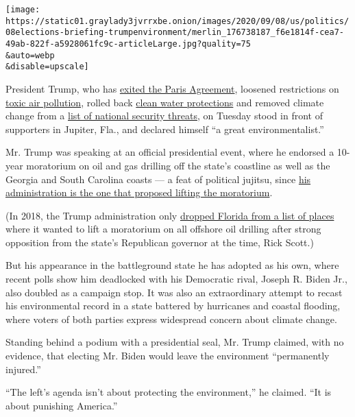 \texttt{[image: https://static01.graylady3jvrrxbe.onion/images/2020/09/08/us/politics/08elections-briefing-trumpenvironment/merlin\_176738187\_f6e1814f-cea7-49ab-822f-a5928061fc9c-articleLarge.jpg?quality=75\\\&auto=webp\\\&disable=upscale]}

President Trump, who has
\href{https://www.nytimes3xbfgragh.onion/2019/11/04/climate/trump-paris-agreement-climate.html}{exited
the Paris Agreement}, loosened restrictions on
\href{https://www.nytimes3xbfgragh.onion/2020/06/04/climate/trump-environment-coronavirus.html}{toxic
air pollution}, rolled back
\href{https://www.nytimes3xbfgragh.onion/2020/01/22/climate/trump-environment-water.html}{clean
water protections} and removed climate change from a
\href{https://www.nytimes3xbfgragh.onion/2019/07/30/opinion/trump-climate-change.html}{list
of national security threats}, on Tuesday stood in front of supporters
in Jupiter, Fla., and declared himself ``a great environmentalist.''

Mr. Trump was speaking at an official presidential event, where he
endorsed a 10-year moratorium on oil and gas drilling off the state's
coastline as well as the Georgia and South Carolina coasts --- a feat of
political jujitsu, since
\href{https://www.nytimes3xbfgragh.onion/2018/01/04/climate/trump-offshore-drilling.html}{his
administration is the one that proposed lifting the moratorium}.

(In 2018, the Trump administration only
\href{https://www.nytimes3xbfgragh.onion/2018/01/09/climate/trump-florida-offshore-drilling.html}{dropped
Florida from a list of places} where it wanted to lift a moratorium on
all offshore oil drilling after strong opposition from the state's
Republican governor at the time, Rick Scott.)

But his appearance in the battleground state he has adopted as his own,
where recent polls show him deadlocked with his Democratic rival, Joseph
R. Biden Jr., also doubled as a campaign stop. It was also an
extraordinary attempt to recast his environmental record in a state
battered by hurricanes and coastal flooding, where voters of both
parties express widespread concern about climate change.

Standing behind a podium with a presidential seal, Mr. Trump claimed,
with no evidence, that electing Mr. Biden would leave the environment
``permanently injured.''

``The left's agenda isn't about protecting the environment,'' he
claimed. ``It is about punishing America.''

